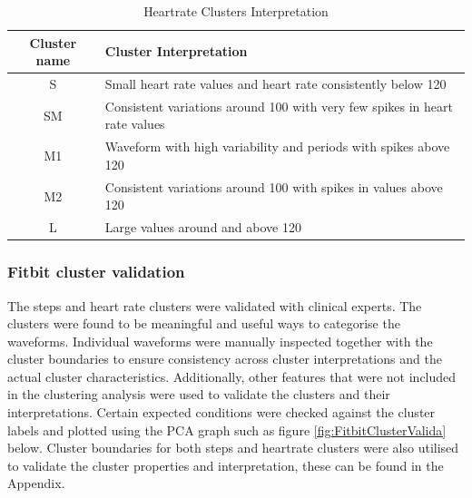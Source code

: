 \documentclass{article}
\begin{document}
\begin{table}[H]
  \caption{Heartrate Clusters Interpretation}
  \label{hr_inter}
  \centering
  \begin{tabular}{ c|l }
    \toprule
    \cmidrule(r){1-2}
    Cluster name & Cluster Interpretation \\
    \midrule
    S & Small heart rate values and heart rate consistently below 120 \\
    \midrule
    SM & Consistent variations around 100 with very few spikes in heart rate values \\
    \midrule
    M1 &  Waveform with high variability and periods with spikes above 120 \\
    \midrule
    M2 & Consistent variations around 100 with spikes in values above 120 \\
    \midrule
    L &  Large values around and above 120 \\
    \bottomrule
    \end{tabular}
\end{table}

\subsubsection{Fitbit cluster validation }

The steps and heart rate clusters were validated with clinical experts. The clusters were found to be meaningful and useful ways to categorise the waveforms. Individual waveforms were manually inspected together with the cluster boundaries to ensure consistency across cluster interpretations and the actual cluster characteristics. Additionally, other features that were not included in the clustering analysis were used to validate the clusters and their interpretations. Certain expected conditions were checked against the cluster labels and plotted using the PCA graph such as figure \ref{fig:FitbitClusterValida} below. Cluster boundaries for both steps and heartrate clusters were also utilised to validate the cluster properties and interpretation, these can be found in the Appendix. 
\end{document}
